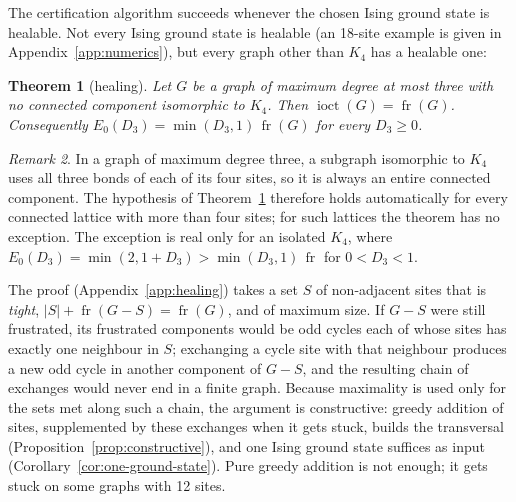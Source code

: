 \documentclass[aps,pre,twocolumn,floatfix,10pt]{revtex4-2}
\newtheorem{theorem}{Theorem}
\theoremstyle{definition}
\theoremstyle{remark}
\newtheorem{remark}[theorem]{Remark}
\newcommand{\fr}{\operatorname{fr}}
\newcommand{\ioct}{\operatorname{ioct}}
\newcommand{\OPT}{E_0}
\begin{document}
The certification algorithm succeeds whenever the chosen Ising ground state is healable. Not every
Ising ground state is healable (an 18-site example is given in Appendix~\ref{app:numerics}), but
every graph other than $K_4$ has a healable one:

\begin{theorem}[healing]\label{thm:healing-full}
Let $G$ be a graph of maximum degree at most three with no connected component isomorphic to
$K_4$. Then $\ioct(G)=\fr(G)$. Consequently $\OPT(D_3)=\min(D_3,1)\,\fr(G)$ for every $D_3\ge0$.
\end{theorem}

\begin{remark}\label{rem:K4}
In a graph of maximum degree three, a subgraph isomorphic to $K_4$ uses all three bonds of each
of its four sites, so it is always an entire connected component. The hypothesis of
Theorem~\ref{thm:healing-full} therefore holds automatically for every connected lattice with
more than four sites; for such lattices the theorem has no exception. The exception is real only
for an isolated $K_4$, where $\OPT(D_3)=\min(2,1+D_3)>\min(D_3,1)\,\fr$ for $0<D_3<1$.
\end{remark}


The proof (Appendix~\ref{app:healing}) takes a set $S$ of non-adjacent sites that is \emph{tight},
$|S|+\fr(G-S)=\fr(G)$, and of maximum size. If $G-S$ were still frustrated, its frustrated
components would be odd cycles each of whose sites has exactly one neighbour in $S$; exchanging a
cycle site with that neighbour produces a new odd cycle in another component of $G-S$, and the
resulting chain of exchanges would never end in a finite graph. Because maximality is used only
for the sets met along such a chain, the argument is constructive: greedy addition of sites,
supplemented by these exchanges when it gets stuck, builds the transversal
(Proposition~\ref{prop:constructive}), and one Ising ground state suffices as input
(Corollary~\ref{cor:one-ground-state}). Pure greedy addition is not enough; it gets stuck on some
graphs with 12 sites.
\end{document}
